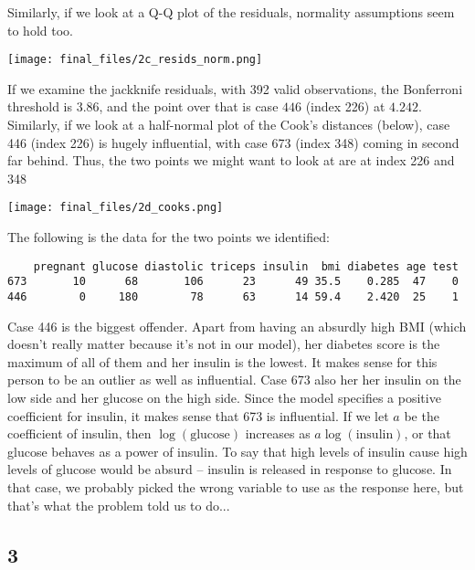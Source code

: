 \documentclass{article}
\begin{document}
Similarly, if we look at a Q-Q plot of the residuals, normality assumptions seem to hold too.

\texttt{[image: final\_files/2c\_resids\_norm.png]}

If we examine the jackknife residuals, with 392 valid observations, the Bonferroni threshold is $3.86$, and the point over that is case $446$ (index 226) at $4.242$. Similarly, if we look at a half-normal plot of the Cook's distances (below), case 446 (index 226) is hugely influential, with case 673 (index 348) coming in second far behind. Thus, the two points we might want to look at are at index 226 and 348

\texttt{[image: final\_files/2d\_cooks.png]}

The following is the data for the two points we identified:
\begin{verbatim}
    pregnant glucose diastolic triceps insulin  bmi diabetes age test
673       10      68       106      23      49 35.5    0.285  47    0
446        0     180        78      63      14 59.4    2.420  25    1
\end{verbatim}
Case 446 is the biggest offender. Apart from having an absurdly high BMI (which doesn't really matter because it's not in our model), her diabetes score is the maximum of all of them and her insulin is the lowest. It makes sense for this person to be an outlier as well as influential. Case 673 also her her insulin on the low side and her glucose on the high side. Since the model specifies a positive coefficient for insulin, it makes sense that 673 is influential.
If we let $a$ be the coefficient of insulin, then $\log(\text{glucose})$ increases as $a\log(\text{insulin})$, or that glucose behaves as a power of insulin. To say that high levels of insulin cause high levels of glucose would be absurd -- insulin is released in response to glucose. In that case, we probably picked the wrong variable to use as the response here, but that's what the problem told us to do...
\subsection*{3}
\end{document}
